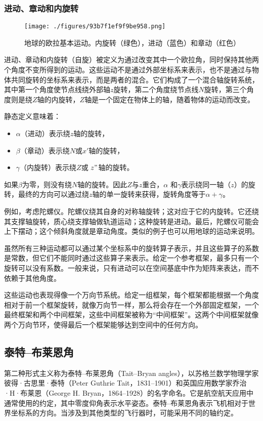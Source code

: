 \subsubsection{进动、章动和内旋转}
\begin{figure}[ht]
\centering
\texttt{[image: ./figures/93b7f1ef9f9be958.png]}
\caption{地球的欧拉基本运动。内旋转（绿色），进动（蓝色）和章动（红色）} \label{fig_OLJ_3}
\end{figure}
进动、章动和内旋转（自旋）被定义为通过改变其中一个欧拉角，同时保持其他两个角度不变所得到的运动。这些运动不是通过外部坐标系来表示，也不是通过与物体共同旋转的坐标系来表示，而是两者的混合。它们构成了一个混合轴旋转系统，其中第一个角度使节点线绕外部轴$z$旋转，第二个角度绕节点线$N$旋转，第三个角度则是绕$Z$轴的内旋转，$Z$轴是一个固定在物体上的轴，随着物体的运动而改变。

静态定义意味着：
\begin{itemize}
\item $\alpha$（进动）表示绕$z$轴的旋转，
\item $\beta$（章动）表示绕$N$或$x'$轴的旋转，
\item $\gamma$（内旋转）表示绕$Z$或 $z"$轴的旋转。
\end{itemize}
如果$\beta$为零，则没有绕$N$轴的旋转。因此$Z$与$z$重合，$\alpha$ 和$\gamma$表示绕同一轴（$z$）的旋转，最终的方向可以通过绕$z$轴的单一旋转来获得，旋转角度等于$\alpha+\gamma$。

例如，考虑陀螺仪。陀螺仪绕其自身的对称轴旋转；这对应于它的内旋转。它还绕其支撑轴旋转，质心绕支撑轴做轨道运动；这种旋转是进动。最后，陀螺仪可能会上下摆动；这个倾斜角度就是章动角度。类似的例子也可以用地球的运动来说明。

虽然所有三种运动都可以通过某个坐标系中的旋转算子表示，并且这些算子的系数是常数，但它们不能同时通过这些算子来表示。给定一个参考框架，最多只有一个旋转可以没有系数。一般来说，只有进动可以在空间基底中作为矩阵来表达，而不依赖于其他角度。

这些运动也表现得像一个万向节系统。给定一组框架，每个框架都能根据一个角度相对于前一个框架旋转，就像万向节一样，那么将会存在一个外部固定框架，一个最终框架和两个中间框架，这些中间框架被称为“中间框架”。这两个中间框架就像两个万向节环，使得最后一个框架能够达到空间中的任何方向。
\subsection{泰特–布莱恩角}
第二种形式主义称为泰特–布莱恩角（Tait–Bryan angles），以苏格兰数学物理学家彼得·古思里·泰特（Peter Guthrie Tait，1831–1901）和英国应用数学家乔治·H·布莱恩（George H. Bryan，1864–1928）的名字命名。它是航空航天应用中通常使用的约定，其中零度仰角表示水平姿态。泰特–布莱恩角表示飞机相对于世界坐标系的方向。当涉及到其他类型的飞行器时，可能采用不同的轴约定。
